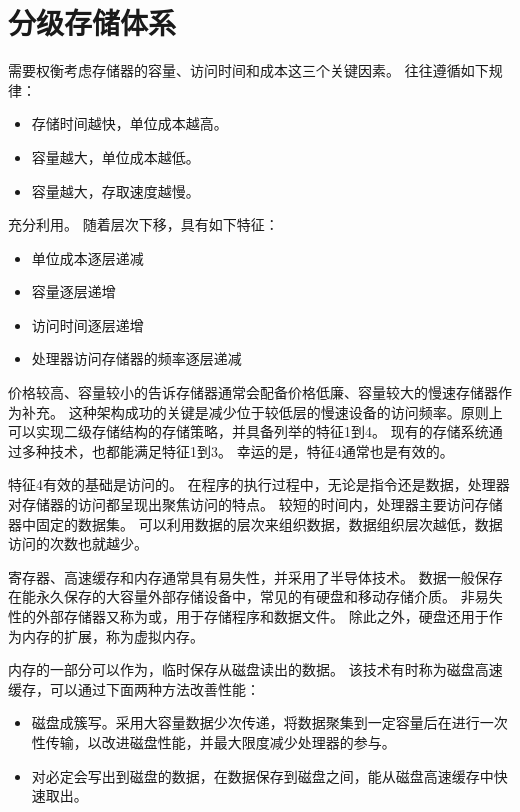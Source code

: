 
\section{分级存储体系}
{
    需要权衡考虑存储器的容量、访问时间和成本这三个关键因素。
    往往遵循如下规律：

    \begin{itemize}
        \item 存储时间越快，单位成本越高。
        \item 容量越大，单位成本越低。
        \item 容量越大，存取速度越慢。
    \end{itemize}

    充分利用。
    随着层次下移，具有如下特征：

    \begin{itemize}
        \item 单位成本逐层递减
        \item 容量逐层递增
        \item 访问时间逐层递增
        \item 处理器访问存储器的频率逐层递减
    \end{itemize}

    价格较高、容量较小的告诉存储器通常会配备价格低廉、容量较大的慢速存储器作为补充。
    这种架构成功的关键是减少位于较低层的慢速设备的访问频率。原则上可以实现二级存储结构的存储策略，并具备列举的特征1到4。
    现有的存储系统通过多种技术，也都能满足特征1到3。
    幸运的是，特征4通常也是有效的。

    特征4有效的基础是访问的。
    在程序的执行过程中，无论是指令还是数据，处理器对存储器的访问都呈现出聚焦访问的特点。
    较短的时间内，处理器主要访问存储器中固定的数据集。
    可以利用数据的层次来组织数据，数据组织层次越低，数据访问的次数也就越少。

    寄存器、高速缓存和内存通常具有易失性，并采用了半导体技术。
    数据一般保存在能永久保存的大容量外部存储设备中，常见的有硬盘和移动存储介质。
    非易失性的外部存储器又称为或，用于存储程序和数据文件。
    除此之外，硬盘还用于作为内存的扩展，称为虚拟内存。

    内存的一部分可以作为，临时保存从磁盘读出的数据。
    该技术有时称为磁盘高速缓存，可以通过下面两种方法改善性能：

    \begin{itemize}
        \item 磁盘成簇写。采用大容量数据少次传递，将数据聚集到一定容量后在进行一次性传输，以改进磁盘性能，并最大限度减少处理器的参与。
        \item 对必定会写出到磁盘的数据，在数据保存到磁盘之间，能从磁盘高速缓存中快速取出。
    \end{itemize}
}
